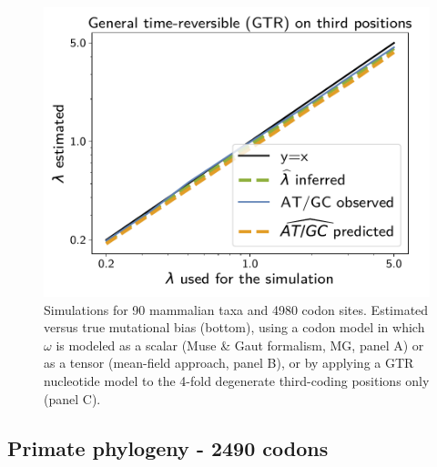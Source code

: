 \documentclass{article}
\begin{document}
\begin{figure}[!htb]
\begin{minipage}{0.325\linewidth}
    \end{minipage}
    \hfill
    \begin{minipage}{0.325\linewidth}
        \includegraphics[width=\linewidth, page=1]{inference_supp_mat/MammalsExons10Mu1.0_lambda_GTR.pdf}
    \end{minipage}
    \hfill
    \caption[Estimation of mutational bias]{
        Simulations for 90 mammalian taxa and 4980 codon sites.
        Estimated versus true mutational bias (bottom), using a codon model in which $\omega$ is modeled as a scalar (Muse \& Gaut formalism, MG, panel A) or as a tensor (mean-field approach, panel B), or by applying a GTR nucleotide model to the 4-fold degenerate third-coding positions only (panel C).
    }
\end{figure}

\subsection{Primate phylogeny - 2490 codons}
\end{document}
